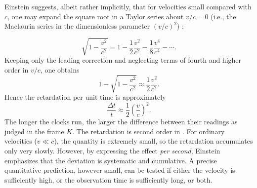 \documentclass[submitted,12pt]{article} %
\providecommand{\DIFaddbegin}{} %
\providecommand{\DIFaddend}{} %
\providecommand{\DIFdelbegin}{} %
\providecommand{\DIFdelend}{} %
\begin{document}
Einstein suggests, albeit rather implicitly, that for velocities small compared with $c$, one may expand the square root in a Taylor series about $v/c=0$ (i.e., the Maclaurin series in the dimensionless parameter $(v/c)^{2}$)%
%
\DIFdelbegin %
\DIFdelend \DIFaddbegin {}\DIFaddend %
%
:

\begin{equation*}
\sqrt{1-\frac{v^{2}}{c^{2}}}
=
1-\frac{1}{2}\frac{v^{2}}{c^{2}}
-\frac{1}{8}\frac{v^{4}}{c^{4}}
-\cdots .
\end{equation*}
%
Keeping only the leading correction and neglecting terms of fourth and higher order in $v/c$, one obtains
\begin{equation*}
1-\sqrt{1-\frac{v^{2}}{c^{2}}}
\approx
\frac{1}{2}\frac{v^{2}}{c^{2}} .
\end{equation*}
%
Hence the retardation per unit time is approximately
%
\begin{equation*}
\frac{\Delta t}{t}
\approx
\frac{1}{2}\left(\frac{v}{c}\right)^{2}.
\end{equation*}
%
The longer the clocks run, the larger the difference between their readings as judged in the frame $K$. The retardation is second order in \betafactorh. For ordinary velocities ($v\ll c$), the quantity \betafactorsquaredh is extremely small, so the retardation accumulates only very slowly. However, by expressing the effect \emph{per second}, Einstein emphasizes that the deviation is systematic and cumulative. A precise quantitative prediction, however small, can be tested if either the velocity is sufficiently high, or the observation time is sufficiently long, or both.
\end{document}

